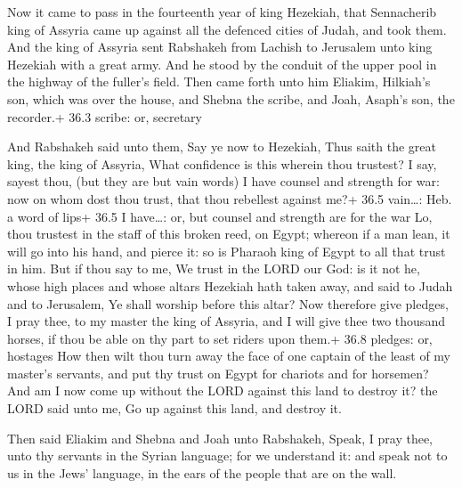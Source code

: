  Now it came to pass in the fourteenth year of king
Hezekiah, that Sennacherib king of Assyria came up against all the
defenced cities of Judah, and took them.  And the king of
Assyria sent Rabshakeh from Lachish to Jerusalem unto king Hezekiah with
a great army. And he stood by the conduit of the upper pool in the
highway of the fuller's field.  Then came forth unto him
Eliakim, Hilkiah's son, which was over the house, and Shebna the scribe,
and Joah, Asaph's son, the recorder.+ 36.3 scribe: or, secretary

 And Rabshakeh said unto them, Say ye now to Hezekiah,
Thus saith the great king, the king of Assyria, What confidence is this
wherein thou trustest?  I say, sayest thou, (but they are
but vain words) I have counsel and strength for war: now on whom dost
thou trust, that thou rebellest against me?+ 36.5 vain\ldots: Heb. a
word of lips+ 36.5 I have\ldots: or, but counsel and strength are for
the war  Lo, thou trustest in the staff of this broken reed,
on Egypt; whereon if a man lean, it will go into his hand, and pierce
it: so is Pharaoh king of Egypt to all that trust in him. 
But if thou say to me, We trust in the LORD our God: is it not he, whose
high places and whose altars Hezekiah hath taken away, and said to Judah
and to Jerusalem, Ye shall worship before this altar?  Now
therefore give pledges, I pray thee, to my master the king of Assyria,
and I will give thee two thousand horses, if thou be able on thy part to
set riders upon them.+ 36.8 pledges: or, hostages  How then
wilt thou turn away the face of one captain of the least of my master's
servants, and put thy trust on Egypt for chariots and for horsemen?
 And am I now come up without the LORD against this land to
destroy it? the LORD said unto me, Go up against this land, and destroy
it.

 Then said Eliakim and Shebna and Joah unto Rabshakeh,
Speak, I pray thee, unto thy servants in the Syrian language; for we
understand it: and speak not to us in the Jews' language, in the ears of
the people that are on the wall.

